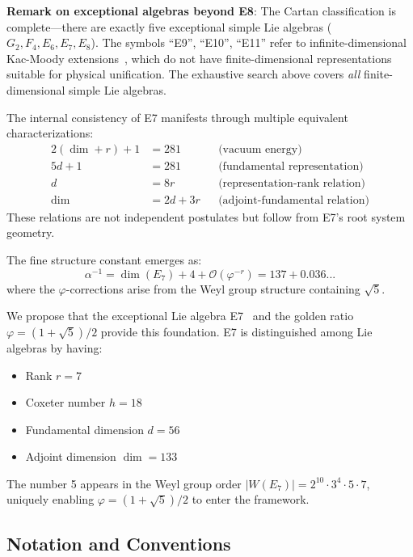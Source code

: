 \documentclass[11pt,a4paper]{article}
\begin{document}
\textbf{Remark on exceptional algebras beyond E8}: The Cartan classification is complete---there are exactly five exceptional simple Lie algebras ($G_2, F_4, E_6, E_7, E_8$). The symbols ``E9'', ``E10'', ``E11'' refer to infinite-dimensional Kac-Moody extensions~\cite{Kac1990}, which do not have finite-dimensional representations suitable for physical unification. The exhaustive search above covers \emph{all} finite-dimensional simple Lie algebras.

The internal consistency of E7 manifests through multiple equivalent characterizations:
\begin{align}
2(\dim + r) + 1 &= 281 & &\text{(vacuum energy)} \\
5d + 1 &= 281 & &\text{(fundamental representation)} \\
d &= 8r & &\text{(representation-rank relation)} \\
\dim &= 2d + 3r & &\text{(adjoint-fundamental relation)}
\end{align}
These relations are not independent postulates but follow from E7's root system geometry.

The fine structure constant emerges as:
\begin{equation}
\alpha^{-1} = \dim(E_7) + 4 + \mathcal{O}(\varphi^{-r}) = 137 + 0.036...
\end{equation}
where the $\varphi$-corrections arise from the Weyl group structure containing $\sqrt{5}$.

We propose that the exceptional Lie algebra E7~\cite{Humphreys1972,Adams1996} and the golden ratio $\varphi = (1+\sqrt{5})/2$ provide this foundation. E7 is distinguished among Lie algebras by having:
\begin{itemize}
\item Rank $r = 7$
\item Coxeter number $h = 18$
\item Fundamental dimension $d = 56$
\item Adjoint dimension $\dim = 133$
\end{itemize}

The number 5 appears in the Weyl group order $|W(E_7)| = 2^{10} \cdot 3^4 \cdot 5 \cdot 7$, uniquely enabling $\varphi = (1+\sqrt{5})/2$ to enter the framework.

\subsection{Notation and Conventions}
\end{document}
